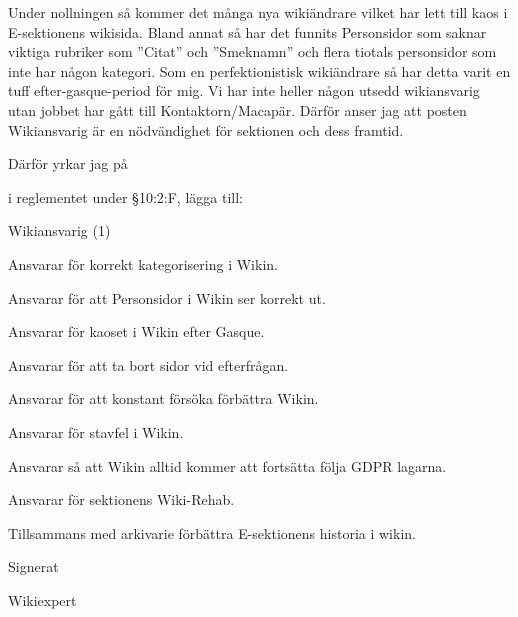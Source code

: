 \documentclass[../_main/handlingar.tex]{subfiles}
\begin{document}
Under nollningen så kommer det många nya wikiändrare vilket har lett till kaos i E-sektionens
wikisida. Bland annat så har det funnits Personsidor som saknar viktiga rubriker som ”Citat” och
”Smeknamn” och flera tiotals personsidor som inte har någon kategori. Som en perfektionistisk
wikiändrare så har detta varit en tuff efter-gasque-period för mig. Vi har inte heller någon utsedd
wikiansvarig utan jobbet har gått till Kontaktorn/Macapär. Därför anser jag att posten Wikiansvarig
är en nödvändighet för sektionen och dess framtid.

Därför yrkar jag på

\begin{attsatser}
\att i reglementet under \S10:2:F, lägga till:\par
\begin{emptylist}
    \item Wikiansvarig (1)
      \begin{dashlist}
        \item Ansvarar för korrekt kategorisering i Wikin.
        \item Ansvarar för att Personsidor i Wikin ser korrekt ut.
        \item Ansvarar för kaoset i Wikin efter Gasque.
        \item Ansvarar för att ta bort sidor vid efterfrågan.
        \item Ansvarar för att konstant försöka förbättra Wikin.
        \item Ansvarar för stavfel i Wikin.
        \item Ansvarar så att Wikin alltid kommer att fortsätta följa GDPR lagarna.
        \item Ansvarar för sektionens Wiki-Rehab.
        \item Tillsammans med arkivarie förbättra E-sektionens historia i wikin.
      \end{dashlist}
    \end{emptylist}
\end{attsatser}
\begin{signatures}{1}
    Signerat
    \signature{Anonym}{Wikiexpert}
\end{signatures}
\end{document}
